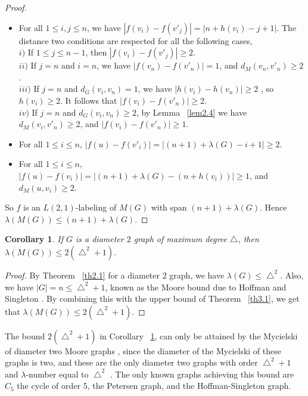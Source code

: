 \documentclass{article}
\newtheorem{cor} {Corollary}
\newtheorem{open problem} {Open Problem}
\numberwithin{lemma}{section}
\numberwithin{theorem}{section}
\numberwithin{cor}{section}
\numberwithin{prop}{section}
\numberwithin{con}{section}
\numberwithin{claim}{section}
\numberwithin{obs}{section}
\numberwithin{dnt}{section}
\begin{document}
\begin{proof}
\begin{itemize}
		\item For all $1\leq i,j\leq n$, we have  $|f(v_i)-f(v'_j)|=|n+h(v_i)-j+1|$. The distance two conditions are respected for all the following cases,\\
		$i)$ If $1\leq j\leq n-1$,  then $ |f(v_i)-f(v'_j)|\geq 2$.\\
		$ii)$ If $j=n$ and $i=n$, we have  $ |f(v_n)-f(v'_n)|=1$, and $d_M(v_n,v'_n)\geq 2$.\\
		$iii)$ If $j=n$ and $ d_G(v_i,v_n)=1$, we have $ |h(v_i)-h(v_n)|\geq 2$ , so $h(v_i)\geq 2$. It follows that $|f(v_i)-f(v'_n)|\geq 2$.\\
		$iv)$ If $j=n$ and $ d_G(v_i,v_n)\geq 2$, by Lemma ~\ref{lem2.4} we have  $d_{M }(v_i,v'_n)\geq 2$, and $|f(v_i)-f(v'_n)|\geq 1$.
		\item  For all $1\leq i\leq n $,  $ |f(u)-f(v'_i)|=|(n+1)+\lambda (G)-i+1| \geq 2.$
		\item For all $1\leq i\leq n$,   $ |f(u)-f(v_i)|=|(n+1)+\lambda (G)-(n+h(v_i))|\geq 1$, and $d_{M }(u,v_i)\geq 2$.
	\end{itemize}
	\par 
	So $f$ is an $L(2,1)$-labeling of $M (G)$ with span $(n+1)+\lambda(G)$. Hence $\lambda(M(G) )\leq (n+1)+\lambda(G).$
\end{proof}
\begin{cor} \label{cor3.1}
	If $G$ is a diameter $2$ graph of maximum degree $\bigtriangleup$, then $ \lambda(M(G)) \leq 2(\bigtriangleup^2+1)$.	
\end{cor}
\begin{proof} 
	By Theorem ~\ref{th2.1} for a diameter $2$ graph,  we have  $\lambda(G) \leq \bigtriangleup^2$. Also, we have $|G|=n\leq \bigtriangleup^2+1$, known as the Moore bound due to Hoffman and Singleton \cite{hoffman}. By combining this with the upper bound of Theorem ~\ref{th3.1}, we get that  $ \lambda(M(G)) \leq 2(\bigtriangleup^2+1)$.	
\end{proof}
\par The bound $2(\bigtriangleup^2+1)$ in Corollary ~\ref{cor3.1}, can only be attained by the Mycielski of diameter two Moore graphs \cite{hoffman}, since the diameter of the Mycielski of these graphs is two, and these are the only diameter two graphs with order $\bigtriangleup^2+1$ and  $\lambda$-number equal to $\bigtriangleup^2$ \cite{griggs}. The only known graphs achieving this bound are $C_5$ the cycle of order $5$, the Petersen graph, and the Hoffman-Singleton graph. 
\end{document}
